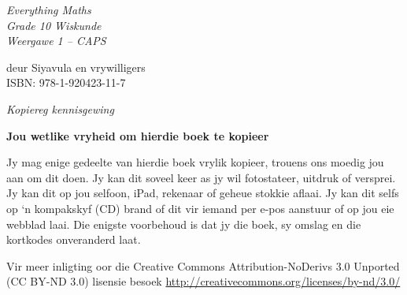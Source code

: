 \newpage
\thispagestyle{empty}
\mbox{}

\newpage
\begin{center}
    \thispagestyle{empty}

    \vspace*{4in}

    {\normalfont\sffamily\fontsize{36}\normalfont\itshape{Everything Maths } \\ \vspace*{1cm}
    {\normalfont\sffamily\fontsize{22}\normalfont\itshape{Grade 10 Wiskunde}}
    \vspace*{1in} \\
    \LARGE Weergawe 1 -- CAPS \\

   {\vspace*{2in}
     deur Siyavula en vrywilligers \\

ISBN: 978-1-920423-11-7
  

\vfill

    }}

\end{center}






\newpage
\thispagestyle{empty}
{
\begin{center}
\normalfont\sffamily\fontsize{22}\normalfont\itshape Kopiereg kennisgewing\\

\vspace*{1in}

\textbf{Jou wetlike vryheid om hierdie boek te kopieer}\\

\end{center}
}

{\LARGE
Jy mag enige gedeelte van hierdie boek vrylik kopieer, trouens ons moedig jou aan om dit doen. Jy kan dit soveel keer as jy wil fotostateer, uitdruk of versprei. Jy kan dit op jou selfoon, iPad, rekenaar of geheue stokkie aflaai. Jy kan dit selfs op ‘n kompakskyf (CD) brand of dit vir iemand per e-pos aanstuur of op jou eie webblad laai.
Die enigste voorbehoud is dat jy die boek, sy omslag en die kortkodes onveranderd laat. \par

Vir meer inligting oor die Creative Commons Attribution-NoDerivs 3.0 Unported (CC BY-ND
3.0) lisensie besoek \underline{http://creativecommons.org/licenses/by-nd/3.0/}}\par

